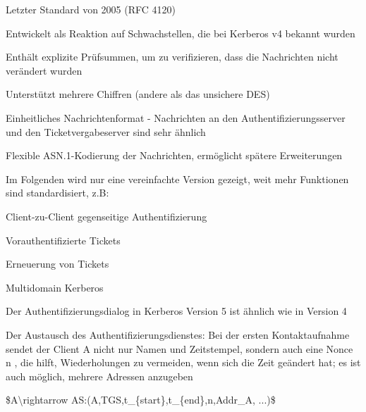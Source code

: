\documentclass[a4paper]{article}
\begin{document}
\begin{multicols}{3}
      \begin{itemize*}
            \item Letzter Standard von 2005 (RFC 4120)
            \item Entwickelt als Reaktion auf Schwachstellen, die bei Kerberos v4
            bekannt wurden
            \begin{itemize*}
                  \item Enthält explizite Prüfsummen, um zu verifizieren, dass die Nachrichten nicht verändert wurden
                  \item Unterstützt mehrere Chiffren (andere als das unsichere DES)
            \end{itemize*}
            \item Einheitliches Nachrichtenformat - Nachrichten an den
            Authentifizierungsserver und den Ticketvergabeserver sind sehr ähnlich
            \item Flexible ASN.1-Kodierung der Nachrichten, ermöglicht spätere
            Erweiterungen
            \item Im Folgenden wird nur eine vereinfachte Version gezeigt, weit mehr
            Funktionen sind standardisiert, z.B:
            \begin{itemize*}
                  \item Client-zu-Client gegenseitige Authentifizierung
                  \item Vorauthentifizierte Tickets
                  \item Erneuerung von Tickets
                  \item Multidomain Kerberos
            \end{itemize*}
            \item Der Authentifizierungsdialog in Kerberos Version 5 ist ähnlich wie in
            Version 4
            \item Der Austausch des Authentifizierungsdienstes: Bei der ersten
            Kontaktaufnahme sendet der Client A nicht nur Namen und Zeitstempel,
            sondern auch eine Nonce n , die hilft, Wiederholungen zu vermeiden,
            wenn sich die Zeit geändert hat; es ist auch möglich, mehrere Adressen
            anzugeben
            \begin{enumerate*}
                  \def\labelenumi{\arabic{enumi}.}
                  \item \$A\textbackslash rightarrow AS:(A,TGS,t\_\{start\},t\_\{end\},n,Addr\_A, ...)\$
            \end{enumerate*}

\end{itemize*}
\end{multicols}
\end{document}
